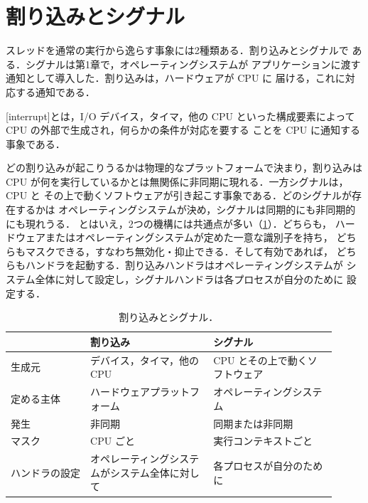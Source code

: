 \documentclass[../main.tex]{subfiles}
\begin{document}
\section{割り込みとシグナル}
\label{sec:l05-int-sig}

スレッドを通常の実行から逸らす事象には2種類ある．割り込みとシグナルで
ある．シグナルは第1章で，オペレーティングシステムが
アプリケーションに渡す通知として導入した．割り込みは，ハードウェアが CPU に
届ける，これに対応する通知である．

\begin{definition}[割り込み]
  [interrupt]とは，I/O デバイス，タイマ，他の CPU
  といった構成要素によって CPU の外部で生成され，何らかの条件が対応を要する
  ことを CPU に通知する事象である．
\end{definition}

どの割り込みが起こりうるかは物理的なプラットフォームで決まり，割り込みは
CPU が何を実行しているかとは無関係に非同期に現れる．一方シグナルは，CPU と
その上で動くソフトウェアが引き起こす事象である．どのシグナルが存在するかは
オペレーティングシステムが決め，シグナルは同期的にも非同期的にも現れうる．
とはいえ，2つの機構には共通点が多い（\cref{tab:l05-int-vs-sig}）．どちらも，
ハードウェアまたはオペレーティングシステムが定めた一意な識別子を持ち，
どちらもマスクできる，すなわち無効化・抑止できる．そして有効であれば，
どちらもハンドラを起動する．割り込みハンドラはオペレーティングシステムが
システム全体に対して設定し，シグナルハンドラは各プロセスが自分のために
設定する．

\begin{table}[htbp]
  \centering
  \caption{割り込みとシグナル．}
  \label{tab:l05-int-vs-sig}
  \small
  \begin{tabular}{@{}>{\raggedright\arraybackslash}p{0.22\linewidth}>{\raggedright\arraybackslash}p{0.345\linewidth}>{\raggedright\arraybackslash}p{0.345\linewidth}@{}}
    \toprule
    & 割り込み & シグナル \\
    \midrule
    生成元 & デバイス，タイマ，他の CPU & CPU とその上で動くソフトウェア \\
    定める主体 & ハードウェアプラットフォーム & オペレーティングシステム \\
    発生 & 非同期 & 同期または非同期 \\
    マスク & CPU ごと & 実行コンテキストごと \\
    ハンドラの設定 & オペレーティングシステムがシステム全体に対して
      & 各プロセスが自分のために \\
    \bottomrule
  \end{tabular}
\end{table}
\end{document}
